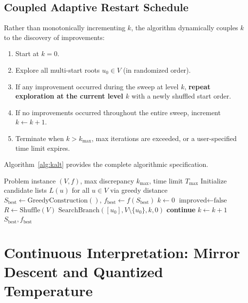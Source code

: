 \documentclass[11pt,a4paper]{article}
\begin{document}
\subsection{Coupled Adaptive Restart Schedule}
Rather than monotonically incrementing $k$, the algorithm dynamically couples $k$ to the discovery of improvements:
\begin{enumerate}
    \item Start at $k = 0$.
    \item Explore all multi-start roots $u_0 \in V$ (in randomized order).
    \item If any improvement occurred during the sweep at level $k$, \textbf{repeat exploration at the current level $k$} with a newly shuffled start order.
    \item If no improvements occurred throughout the entire sweep, increment $k \leftarrow k + 1$.
    \item Terminate when $k > k_{\text{max}}$, max iterations are exceeded, or a user-specified time limit expires.
\end{enumerate}

Algorithm~\ref{alg:kalt} provides the complete algorithmic specification.

\begin{algorithm}[htbp]
\caption{$k$-Alternatives Meta-Heuristic}\label{alg:kalt}
\begin{algorithmic}[1]
\REQUIRE Problem instance $(V, f)$, max discrepancy $k_{\text{max}}$, time limit $T_{\text{max}}$
\STATE Initialize candidate lists $L(u)$ for all $u \in V$ via greedy distance
\STATE $S_{\text{best}} \leftarrow \text{GreedyConstruction}()$, $f_{\text{best}} \leftarrow f(S_{\text{best}})$
\STATE $k \leftarrow 0$
    \STATE $\text{improved} \leftarrow \text{false}$
    \STATE $R \leftarrow \text{Shuffle}(V)$
        \STATE $\text{SearchBranch}([u_0], V \setminus \{u_0\}, k, 0)$
    \ENDFOR
        \STATE \textbf{continue} 
    \ELSE
        \STATE $k \leftarrow k + 1$ 
    \ENDIF
\ENDWHILE
\RETURN $S_{\text{best}}, f_{\text{best}}$
\end{algorithmic}
\end{algorithm}

\section{Continuous Interpretation: Mirror Descent and Quantized Temperature}
\label{sec:continuous}
\end{document}
